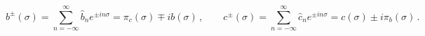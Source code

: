 \begin{equation}
b^{\pm }(\sigma )=\sum_{n=-\infty }^{\infty }\hat{b}_{n}e^{\pm in\sigma
}=\pi _{c}(\sigma )\mp ib(\sigma )\,,\qquad c^{\pm }(\sigma
)=\sum_{n=-\infty }^{\infty }\hat{c}_{n}e^{\pm in\sigma }=c(\sigma )\pm i\pi
_{b}(\sigma )\,.  \label{eq:ghosts_coord}
\end{equation}

